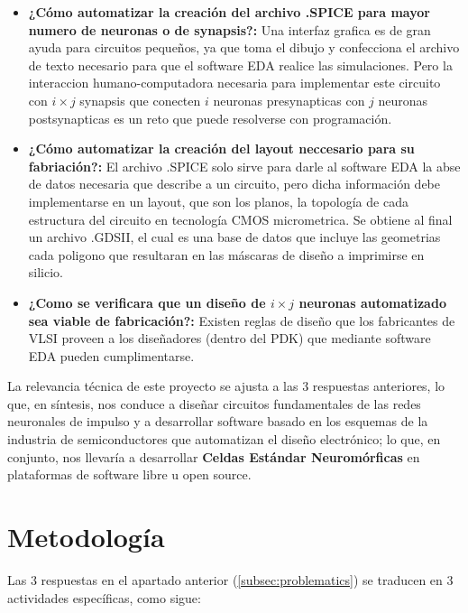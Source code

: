 \documentclass[letter, 12pt]{article}
\begin{document}
\begin{itemize}
    \item \textbf{¿Cómo automatizar la creación del archivo .SPICE para mayor numero de neuronas o de synapsis?: } Una interfaz grafica es de gran ayuda para circuitos pequeños, ya que toma el dibujo y confecciona el archivo de texto necesario para que el software EDA realice las simulaciones.  Pero la interaccion humano-computadora necesaria para implementar este circuito con $i\times j$ synapsis que conecten $i$ neuronas presynapticas con $j$ neuronas postsynapticas es un reto que puede resolverse con programación. 
    \item \textbf{¿Cómo automatizar la creación del layout neccesario para su fabriación?:} El archivo .SPICE solo sirve para darle al software EDA la abse de datos necesaria que describe a un circuito, pero dicha información debe implementarse en un layout, que son los planos, la topología de cada estructura del circuito en tecnología CMOS micrometrica. Se obtiene al final un archivo .GDSII, el cual es una base de datos que incluye las geometrias cada poligono que resultaran en las máscaras de diseño a imprimirse en silicio. 
    \item \textbf{¿Como se verificara que un diseño de $i\times j$ neuronas automatizado sea viable de fabricación?:} Existen reglas de diseño que los fabricantes de VLSI proveen a los diseñadores (dentro del PDK) que mediante software EDA pueden cumplimentarse. 

    
\end{itemize}


La relevancia técnica de este proyecto se ajusta a las 3 respuestas anteriores, lo que, en síntesis, nos conduce a diseñar circuitos fundamentales de las redes neuronales de impulso y a desarrollar software basado en los esquemas de la industria de semiconductores que automatizan el diseño electrónico; lo que, en conjunto, nos llevaría a desarrollar \textbf{Celdas Estándar Neuromórficas} en plataformas de software libre u open source.


\section{Metodología}

Las 3 respuestas en el apartado anterior (\ref{subsec:problematics}) se traducen en 3 actividades específicas, como sigue:
\end{document}
